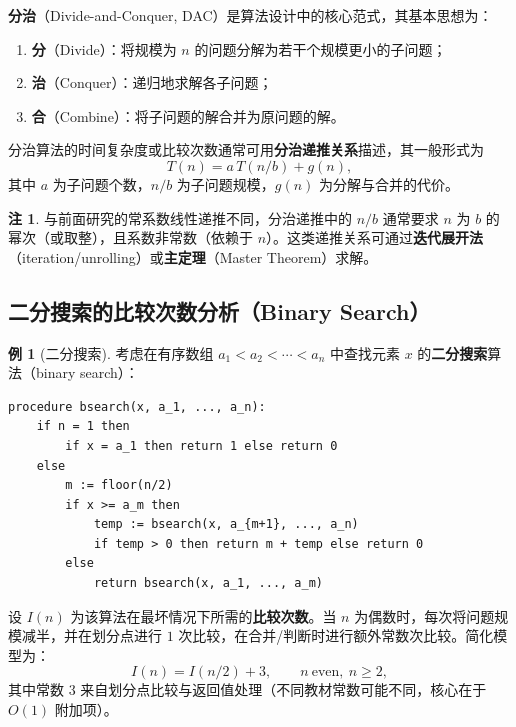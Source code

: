 \documentclass[UTF8,11pt,a4paper]{ctexbook}   %
\theoremstyle{definition}
\newtheorem{example}{例}[section]
\newtheorem{remark}{注}[section]
\begin{document}
\textbf{分治}（Divide-and-Conquer, DAC）是算法设计中的核心范式，其基本思想为：
\begin{enumerate}
    \item \textbf{分}（Divide）：将规模为 $n$ 的问题分解为若干个规模更小的子问题；
    \item \textbf{治}（Conquer）：递归地求解各子问题；
    \item \textbf{合}（Combine）：将子问题的解合并为原问题的解。
\end{enumerate}

分治算法的时间复杂度或比较次数通常可用\textbf{分治递推关系}描述，其一般形式为
\[
T(n) = a\,T(n/b) + g(n),
\]
其中 $a$ 为子问题个数，$n/b$ 为子问题规模，$g(n)$ 为分解与合并的代价。

\begin{remark}
与前面研究的常系数线性递推不同，分治递推中的 $n/b$ 通常要求 $n$ 为 $b$ 的幂次（或取整），且系数非常数（依赖于 $n$）。这类递推关系可通过\textbf{迭代展开法}（iteration/unrolling）或\textbf{主定理}（Master Theorem）求解。
\end{remark}

\subsection{二分搜索的比较次数分析（Binary Search）}

\begin{example}[二分搜索]
考虑在有序数组 $a_1 < a_2 < \cdots < a_n$ 中查找元素 $x$ 的\textbf{二分搜索}算法（binary search）：

\begin{verbatim}
procedure bsearch(x, a_1, ..., a_n):
    if n = 1 then
        if x = a_1 then return 1 else return 0
    else
        m := floor(n/2)
        if x >= a_m then
            temp := bsearch(x, a_{m+1}, ..., a_n)
            if temp > 0 then return m + temp else return 0
        else
            return bsearch(x, a_1, ..., a_m)
\end{verbatim}

设 $I(n)$ 为该算法在最坏情况下所需的\textbf{比较次数}。当 $n$ 为偶数时，每次将问题规模减半，并在划分点进行 $1$ 次比较，在合并/判断时进行额外常数次比较。简化模型为：
\[
I(n) = I(n/2) + 3,\qquad n\ \text{even},\ n\ge 2,
\]
其中常数 $3$ 来自划分点比较与返回值处理（不同教材常数可能不同，核心在于 $O(1)$ 附加项）。
\end{example}
\end{document}
